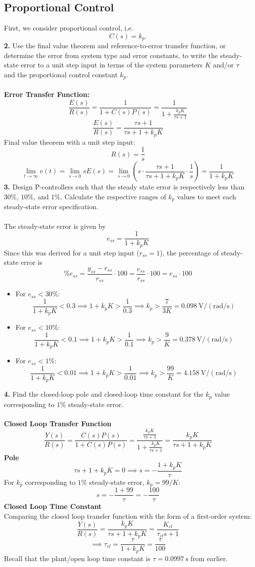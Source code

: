 ﻿\documentclass[12pt]{article}
\begin{document}
\subsection*{Proportional Control}
First, we consider proportional control, i.e.
\[
C(s)=k_p.
\]
\textbf{2.} Use the final value theorem and reference-to-error transfer function, or determine the error from system type and error constants, to write the steady-state error to a unit step input in terms of the system parameters $K$ and/or $\tau$ and the proportional control constant $k_p$.\\\\
\textbf{Error Transfer Function:}
\[\frac{E(s)}{R(s)}=\frac{1}{1+C(s)P(s)} = \frac{1}{1 + \frac{k_p K}{\tau s+1}}\]
\[\frac{E(s)}{R(s)}=\frac{\tau s+1}{\tau s+1 + k_p K}\]
Final value theorem with a unit step input:
\[R(s) = \frac{1}{s}\]
\[\lim_{t\to\infty} e(t) = \lim_{s\to 0} sE(s) = \lim_{s\to 0} \left(s \cdot \frac{\tau s+1}{\tau s+1 + k_p K}\cdot \frac{1}{s}\right) = \boxed{\frac{1}{1 + k_p K}}\]
\textbf{3.} Design P-controllers such that the steady state error is respectively less than $30\%$, $10\%$, and $1\%$. Calculate the respective ranges of $k_p$ values to meet each steady-state error specification.\\\\
The steady-state error is given by
\[e_{ss} = \frac{1}{1 + k_p K}\]
Since this was derived for a unit step input ($r_{ss} = 1$), the percentage of steady-state error is
\[\%e_{ss} = \frac{y_{ss} - r_{ss}}{r_{ss}} \cdot 100 = \frac{e_{ss}}{r_{ss}} \cdot 100 = e_{ss} \cdot 100\]
\begin{itemize}
    \item For $e_{ss} < 30\%$:
    \[\frac{1}{1 + k_p K} < 0.3 \implies 1 + k_p K > \frac{1}{0.3} \implies \boxed{k_p > \frac{7}{3K}  = 0.098~\mathrm{V/(rad/s)}}\]
    \item For $e_{ss} < 10\%$:
    \[\frac{1}{1 + k_p K} < 0.1 \implies 1 + k_p K > \frac{1}{0.1} \implies \boxed{k_p > \frac{9}{K} = 0.378~\mathrm{V/(rad/s)}}\]
    \item For $e_{ss} < 1\%$:
    \[\frac{1}{1 + k_p K} < 0.01 \implies 1 + k_p K > \frac{1}{0.01} \implies \boxed{k_p > \frac{99}{K}=4.158~\mathrm{V/(rad/s)}}\]
\end{itemize}
\textbf{4.} Find the closed-loop pole and closed-loop time constant for the $k_p$ value corresponding to $1\%$ steady-state error.\\\\
\textbf{Closed Loop Transfer Function}
\[\frac{Y(s)}{R(s)} = \frac{C(s)P(s)}{1+C(s)P(s)} = \frac{\frac{k_p K}{\tau s+1}}{1+\frac{k_p K}{\tau s+1}} = \frac{k_p K}{\tau s+1+k_p K}\]
\textbf{Pole}
\[\tau s+1+k_p K = 0 \implies \boxed{s = -\frac{1+k_p K}{\tau}}\]
For $k_p$ corresponding to $1\%$ steady-state error, $k_p = 99/K$:
\[s = -\frac{1+99}{\tau} = \boxed{-\frac{100}{\tau}}\]
\textbf{Closed Loop Time Constant}\\
Comparing the closed loop transfer function with the form of a first-order system:
\[\frac{Y(s)}{R(s)} = \frac{k_p K}{\tau s+1+k_p K} = \frac{K_{cl}}{\tau_{cl} s + 1}\]
\[\implies \tau_{cl} = \frac{\tau}{1+k_p K} = \boxed{\frac{\tau}{100}}\]
Recall that the plant/open loop time constant is $\tau = 0.0997~\mathrm{s}$ from earlier.
\end{document}
